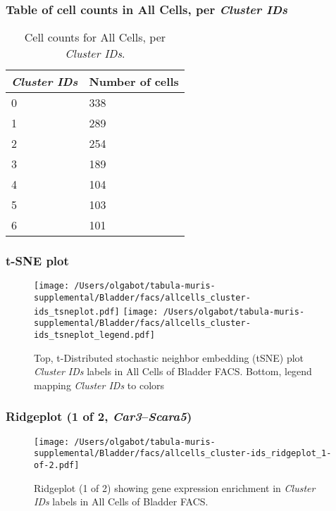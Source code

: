 \subsubsection{Table of cell counts in All Cells, per \emph{Cluster IDs}}\begin{table}[h]
\centering
\label{my-label}
\begin{tabular}{@{}ll@{}}
\toprule

\emph{Cluster IDs}& Number of cells \\ \midrule
0 & 338 \\

1 & 289 \\

2 & 254 \\

3 & 189 \\

4 & 104 \\

5 & 103 \\

6 & 101 \\
\bottomrule
\end{tabular}
\caption{Cell counts for All Cells, per \emph{Cluster IDs}.}
\end{table}

\clearpage
\subsubsection{t-SNE plot}
\begin{figure}[h]
\centering
\texttt{[image: /Users/olgabot/tabula-muris-supplemental/Bladder/facs/allcells\_cluster-ids\_tsneplot.pdf]}
\texttt{[image: /Users/olgabot/tabula-muris-supplemental/Bladder/facs/allcells\_cluster-ids\_tsneplot\_legend.pdf]}
\caption{Top, t-Distributed stochastic neighbor embedding (tSNE) plot  \emph{Cluster IDs} labels in All Cells of Bladder FACS. Bottom, legend mapping \emph{Cluster IDs} to colors}
\end{figure}


\clearpage

\subsubsection{Ridgeplot (1 of 2, \emph{Car3}--\emph{Scara5})}
\begin{figure}[h]
\centering
\texttt{[image: /Users/olgabot/tabula-muris-supplemental/Bladder/facs/allcells\_cluster-ids\_ridgeplot\_1-of-2.pdf]}

\caption{ Ridgeplot (1 of 2)  showing gene expression enrichment in \emph{Cluster IDs} labels in All Cells of Bladder FACS. }
\end{figure}


